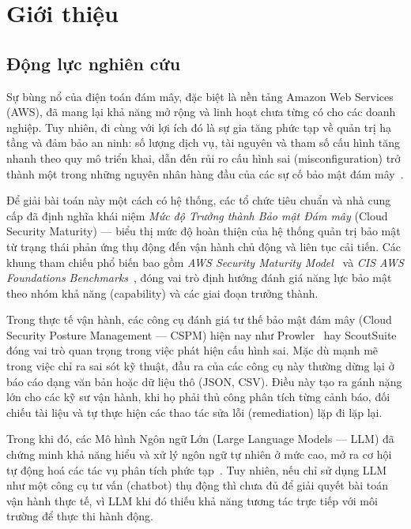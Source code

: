 \chapter{Giới thiệu}

\section{Động lực nghiên cứu}

Sự bùng nổ của điện toán đám mây, đặc biệt là nền tảng Amazon Web Services (AWS), đã mang lại khả năng mở rộng và linh hoạt chưa từng có cho các doanh nghiệp. Tuy nhiên, đi cùng với lợi ích đó là sự gia tăng phức tạp về quản trị hạ tầng và đảm bảo an ninh: số lượng dịch vụ, tài nguyên và tham số cấu hình tăng nhanh theo quy mô triển khai, dẫn đến rủi ro cấu hình sai (misconfiguration) trở thành một trong những nguyên nhân hàng đầu của các sự cố bảo mật đám mây~\cite{gartner_cspm}.

Để giải bài toán này một cách có hệ thống, các tổ chức tiêu chuẩn và nhà cung cấp đã định nghĩa khái niệm \textit{Mức độ Trưởng thành Bảo mật Đám mây} (Cloud Security Maturity) --- biểu thị mức độ hoàn thiện của hệ thống quản trị bảo mật từ trạng thái phản ứng thụ động đến vận hành chủ động và liên tục cải tiến. Các khung tham chiếu phổ biến bao gồm \textit{AWS Security Maturity Model}~\cite{aws_smm} và \textit{CIS AWS Foundations Benchmarks}~\cite{cis_aws_foundations}, đóng vai trò định hướng đánh giá năng lực bảo mật theo nhóm khả năng (capability) và các giai đoạn trưởng thành.

Trong thực tế vận hành, các công cụ đánh giá tư thế bảo mật đám mây (Cloud Security Posture Management --- CSPM) hiện nay như Prowler~\cite{prowler} hay ScoutSuite~\cite{scoutsuite} đóng vai trò quan trọng trong việc phát hiện cấu hình sai. Mặc dù mạnh mẽ trong việc chỉ ra sai sót kỹ thuật, đầu ra của các công cụ này thường dừng lại ở báo cáo dạng văn bản hoặc dữ liệu thô (JSON, CSV). Điều này tạo ra gánh nặng lớn cho các kỹ sư vận hành, khi họ phải thủ công phân tích từng cảnh báo, đối chiếu tài liệu và tự thực hiện các thao tác sửa lỗi (remediation) lặp đi lặp lại.

Trong khi đó, các Mô hình Ngôn ngữ Lớn (Large Language Models --- LLM) đã chứng minh khả năng hiểu và xử lý ngôn ngữ tự nhiên ở mức cao, mở ra cơ hội tự động hoá các tác vụ phân tích phức tạp~\cite{zhao2023survey}. Tuy nhiên, nếu chỉ sử dụng LLM như một công cụ tư vấn (chatbot) thụ động thì chưa đủ để giải quyết bài toán vận hành thực tế, vì LLM khi đó thiếu khả năng tương tác trực tiếp với môi trường để thực thi hành động.

